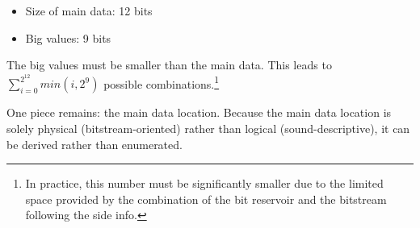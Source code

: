 \documentclass{thesis}
\begin{document}
\begin{itemize}
	\item Size of main data: 12 bits
	\item Big values: 9 bits
\end{itemize}

	The big values must be smaller than the main data. This leads to $\sum_{i=0}^{2^{12}} min(i,2^9)$ possible combinations.\footnote{In practice, this number must be significantly smaller due to the limited space provided by the combination of the bit reservoir and the bitstream following the side info.}
	
	One piece remains: the main data location. Because the main data location is solely physical (bitstream-oriented) rather than logical (sound-descriptive), it can be derived rather than enumerated.
\end{document}
